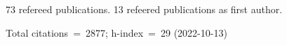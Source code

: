 73 refereed publications. 13 refeered publications as first author.

Total citations~=~2877; h-index~=~29 (2022-10-13)